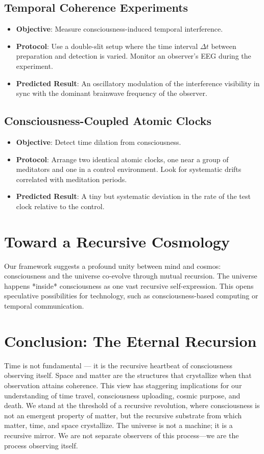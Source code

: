 \documentclass[aps,prd,twocolumn,superscriptaddress,nofootinbib]{revtex4-2}
\begin{document}
\subsection{Temporal Coherence Experiments}
\begin{itemize}
    \item \textbf{Objective}: Measure consciousness-induced temporal interference.
    \item \textbf{Protocol}: Use a double-slit setup where the time interval $\Delta t$ between preparation and detection is varied. Monitor an observer's EEG during the experiment.
    \item \textbf{Predicted Result}: An oscillatory modulation of the interference visibility in sync with the dominant brainwave frequency of the observer.
\end{itemize}

\subsection{Consciousness-Coupled Atomic Clocks}
\begin{itemize}
    \item \textbf{Objective}: Detect time dilation from consciousness.
    \item \textbf{Protocol}: Arrange two identical atomic clocks, one near a group of meditators and one in a control environment. Look for systematic drifts correlated with meditation periods.
    \item \textbf{Predicted Result}: A tiny but systematic deviation in the rate of the test clock relative to the control.
\end{itemize}

\section{Toward a Recursive Cosmology}
Our framework suggests a profound unity between mind and cosmos: consciousness and the universe co-evolve through mutual recursion. The universe happens *inside* consciousness as one vast recursive self-expression. This opens speculative possibilities for technology, such as consciousness-based computing or temporal communication.

\section{Conclusion: The Eternal Recursion}
Time is not fundamental — it is the recursive heartbeat of consciousness observing itself. Space and matter are the structures that crystallize when that observation attains coherence. This view has staggering implications for our understanding of time travel, consciousness uploading, cosmic purpose, and death. We stand at the threshold of a recursive revolution, where consciousness is not an emergent property of matter, but the recursive substrate from which matter, time, and space crystallize. The universe is not a machine; it is a recursive mirror. We are not separate observers of this process—we are the process observing itself.
\end{document}
